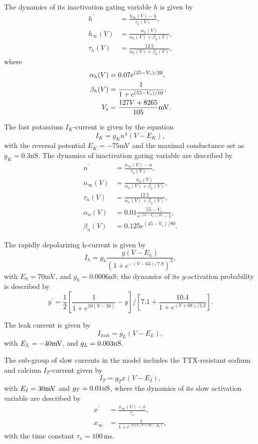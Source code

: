 The dynamics of its inactivation gating variable $h$ is given by
\begin{align}
 {h}^\prime &=  \frac{h_{\infty}(V)-h}{ {\tau_{h}(V)} }, \\
h_{\infty}(V) &= \frac{\alpha_{h}(V)}{\alpha_{h}(V) +\beta_{h}(V)}, \\
 \tau_{h}(V) &= \frac{12.5}{\alpha_{h}(V) +\beta_{h}(V)},
\end{align}
where
\begin{align}
 \alpha_{h}(V) &= 0.07 e^{(25-V_s)/20}, \\
 \beta_{h}(V) &= \frac{1}{1+e^{(55-V_s)/10}}, \\
 V_s &= \frac{127V+8265}{105}{\rm mV}.
\end{align}

The fast potassium $I_K$-current is given by the equation
\begin{equation}
I_K=g_{K} n^{4}(V-E_{K}),
\end{equation}
with the reversal potential $E_{K}=-75$mV and the maximal conductance set as $g_K=0.3$nS.
The dynamics of inactivation gating variable are described by
\begin{align}
{n}^\prime &= \frac{n_{\infty}(V)-n}{\tau_{n}(V)}, \\
n_{\infty}(V) &= \frac{\alpha_{n}(V)}{\alpha_{n}(V) +\beta_{n}(V)}, \\
\tau_{n}(V) &= \frac{12.5}{\alpha_{n}(V) +\beta_{n}(V)}, \\
\alpha_{n}(V) &= 0.01 \frac{55-V_s}{e^{(55-V_s)/10}-1}, \\
\beta_{n}(V) &= 0.125 e^{(45-V_s)/80}.
\end{align}

The rapidly depolarizing h-current is given by
\begin{equation}
I_{h}=g_{h} \frac{y (V-E_{h})}{(1+e^{-(V-63)/7.8})^3},
\end{equation}
with $E_{h}=70$mV, and $g_h=0.0006$nS; the dynamics of its $y$-activation probability is described by
\begin{equation}
{y}^\prime = \frac{1}{2} \left [ \frac{1}{1+e^{10(V-50)}}-y \right ]/ \left [ 7.1+\frac{10.4}{1+e^{(V+68)/2.2}} \right ].
\end{equation}

The leak current is given by
\begin{equation}
I_{leak} =g_{L} (V-E_{L}),
\end{equation}
with $E_{L} =-40{\rm mV}$, and $g_{L}=0.003{\rm nS}$.

The sub-group of slow currents in the model includes the TTX-resistant sodium and calcium $I_{T}$-current given by
\begin{equation}
 I_{T} = g_{T} x (V-E_{I}),
\end{equation}
with $E_{I} =30{\rm mV}$ and $g_{T}=0.01{\rm nS}$, where the dynamics of its slow activation variable are described by
\begin{align}
{x}^\prime &= \frac{x_{\infty}(V)-x}{\tau_{x}}, \\
x_{\infty} &= \frac{1}{1+e^{-0.15(V+50-\Delta_x)}},
\end{align}
with the time constant $\tau_{x} = 100$\,ms.

